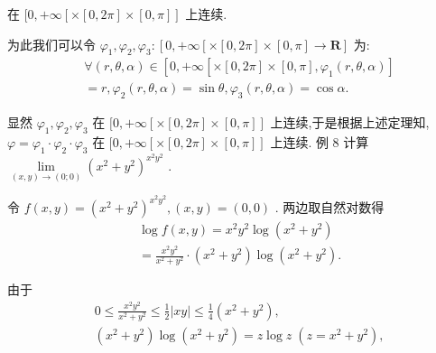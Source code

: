 在 $\lbrack 0, + \infty \left\lbrack  {\times \left\lbrack  {0,{2\pi }}\right\rbrack   \times  \left\lbrack  {0,\pi }\right\rbrack  }\right\rbrack$ 上连续.

为此我们可以令 ${\varphi }_{1},{\varphi }_{2},{\varphi }_{3} : \left\lbrack  {0, + \infty \left\lbrack  {\times \left\lbrack  {0,{2\pi }}\right\rbrack   \times  \left\lbrack  {0,\pi }\right\rbrack   \rightarrow  \mathbf{R}}\right\rbrack  }\right.$ 为:
\begin{align*}
	&\forall \left( {r,\theta ,\alpha }\right)  \in  \left\lbrack  {0, + \infty \left\lbrack  {\times \left\lbrack  {0,{2\pi }}\right\rbrack   \times  \left\lbrack  {0,\pi }\right\rbrack  ,{\varphi }_{1}\left( {r,\theta ,\alpha }\right) }\right\rbrack  }\right.\\
	&= r,{\varphi }_{2}\left( {r,\theta ,\alpha }\right)  = \sin \theta ,{\varphi }_{3}\left( {r,\theta ,\alpha }\right)  = \cos \alpha .
\end{align*}

显然 ${\varphi }_{1},{\varphi }_{2},{\varphi }_{3}$ 在 $\lbrack 0, + \infty \left\lbrack  {\times \left\lbrack  {0,{2\pi }}\right\rbrack   \times  \left\lbrack  {0,\pi }\right\rbrack  }\right\rbrack$ 上连续,于是根据上述定理知, $\varphi  = {\varphi }_{1} \cdot  {\varphi }_{2} \cdot  {\varphi }_{3}$ 在 $\lbrack 0, + \infty \left\lbrack  {\times \left\lbrack  {0,{2\pi }}\right\rbrack   \times  \left\lbrack  {0,\pi }\right\rbrack  }\right\rbrack$ 上连续. 例 8 计算 $\mathop{\lim }\limits_{{\left( {x,y}\right)  \rightarrow  \left( {0;0}\right) }}{\left( {x}^{2} + {y}^{2}\right) }^{{x}^{2}{y}^{2}}$ .

令 $f\left( {x,y}\right)  = {\left( {x}^{2} + {y}^{2}\right) }^{{x}^{2}{y}^{2}},\left( {x,y}\right)  = \left( {0,0}\right)$ . 两边取自然对数得
\begin{align*}
	&\log f\left( {x,y}\right)  = {x}^{2}{y}^{2}\log \left( {{x}^{2} + {y}^{2}}\right)\\
	&= \frac{{x}^{2}{y}^{2}}{{x}^{2} + {y}^{2}} \cdot  \left( {{x}^{2} + {y}^{2}}\right) \log \left( {{x}^{2} + {y}^{2}}\right) .
\end{align*}

由于
\begin{align*}
	&0 \leq  \frac{{x}^{2}{y}^{2}}{{x}^{2} + {y}^{2}} \leq  \frac{1}{2}\left| {xy}\right|  \leq  \frac{1}{4}\left( {{x}^{2} + {y}^{2}}\right) ,\\
	&\left( {{x}^{2} + {y}^{2}}\right) \log \left( {{x}^{2} + {y}^{2}}\right)  = z\log z\;\left( {z = {x}^{2} + {y}^{2}}\right) ,
\end{align*}

